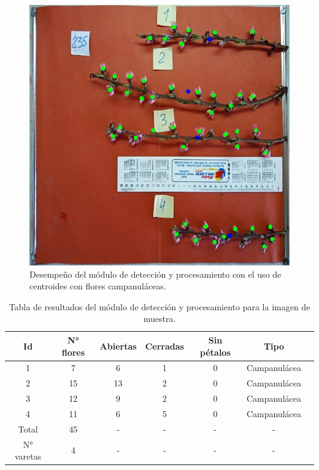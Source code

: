 \begin{figure}[ht]
	\centering
	\includegraphics[scale=0.5]{./Figures/centroids3.jpeg}
	\caption{Desempeño del módulo de detección y procesamiento con el uso de centroides con flores campanuláceas.}
	\label{fig:DesempeñoMod2}
\end{figure}
\newpage

\begin{table}[h]
	\centering
	\caption{Tabla de resultados del módulo de detección y procesamiento para la imagen de muestra.}
	\begin{tabular}{c c c c c c c}    
		\toprule
		\textbf{Id}&\textbf{N° flores}&\textbf{Abiertas}&\textbf{Cerradas}&\textbf{Sin pétalos} &\textbf{Tipo}\\
		\midrule
		1 & 7 & 6 & 1 & 0 &  Campanulácea\\
		2 & 15 & 13 & 2 & 0 &  Campanulácea\\
		3 & 12 & 9 & 2 & 0 &  Campanulácea\\
		4 & 11 & 6 & 5 & 0 &  Campanulácea\\
		Total & 45 & - & - &  - & - \\
		N° varetas & 4 & - &  - & - & - \\
		\bottomrule
		\hline
	\end{tabular}
	\label{tab:resultadosmod2}
\end{table}



